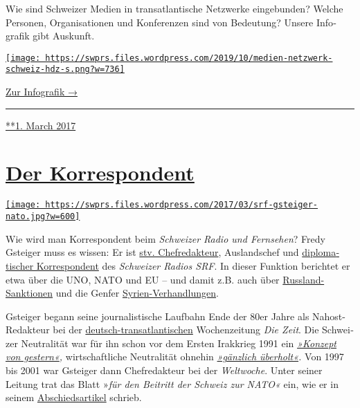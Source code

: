Wie sind Schweizer Medien in trans­at­lantische Netz­werke
ein­ge­bunden? Welche Personen, Organi­sa­tionen und Kon­fe­ren­zen sind
von Bedeutung? Unsere Info­grafik gibt Auskunft.

\href{https://swprs.org/netzwerk-medien-schweiz}{\texttt{[image: https://swprs.files.wordpress.com/2019/10/medien-netzwerk-schweiz-hdz-s.png?w=736]}}

\href{https://swprs.org/netzwerk-medien-schweiz}{Zur Infografik →}

\begin{center}\rule{0.5\linewidth}{\linethickness}\end{center}

\href{https://swprs.org/2017/03/01/das-netzwerk/}{**1. March 2017}

\hypertarget{der-korrespondent}{%
\section{\texorpdfstring{\href{https://swprs.org/2017/03/01/der-korrespondent/}{Der
Korrespondent}}{Der Korrespondent}}\label{der-korrespondent}}

\href{https://swprs.org/2017/03/01/der-korrespondent/}{\texttt{[image: https://swprs.files.wordpress.com/2017/03/srf-gsteiger-nato.jpg?w=600]}}

Wie wird man Kor­res­pon­dent beim \emph{Schwei­zer Radio und
Fern­sehen}? Fredy Gsteiger muss es wissen: Er ist
\href{http://www.persoenlich.com/medien/fredy-gsteiger-neu-in-der-radio-chefredaktion-232921}{stv.
Chef­redakteur}, Auslands­chef und
\href{http://www.srf.ch/radio-srf-1/radio-srf-1/fredy-gsteiger-unser-mann-in-der-uno}{diplo­ma­tischer
Korres­pon­dent} des \emph{Schwei­zer Radios SRF}. In dieser Funktion
be­richtet er etwa über die UNO, NATO und EU -- und damit z.B. auch über
\href{http://www.srf.ch/news/international/dieser-eu-rueckzieher-ist-peinlich}{Russ­land-Sanktionen}
und die Genfer
\href{http://www.srf.ch/news/international/assad-kommt-mit-giftgaseinsaetzen-vorlaeufig-davon}{Syrien-Ver­hand­lungen}.

Gsteiger begann seine journa­lis­tische Lauf­bahn Ende der 80er Jahre
als Nahost-Redakteur bei der
\href{https://swprs.org/netzwerk-medien-deutschland/}{deutsch-trans­atlan­tischen}
Wochen­zeitung \emph{Die Zeit}. Die Schwei­zer Neutra­lität war für ihn
schon vor dem Ersten Irak­krieg 1991 ein
\emph{\href{http://www.zeit.de/1990/44/ein-konzept-von-gestern}{»Konzept
von gestern«},} wirt­schaft­liche Neutralität ohnehin
\emph{\href{http://www.zeit.de/1990/44/ein-konzept-von-gestern}{»gänz­lich
über­holt«}.} Von 1997 bis 2001 war Gsteiger dann Chef­redakteur bei der
\emph{Welt­woche}. Unter seiner Leitung trat das Blatt »\emph{für den
Bei­tritt der Schweiz zur NATO«} ein, wie er in seinem
\href{https://web.archive.org/web/20040722094101/http://www.weltwoche.ch/artikel/?AssetID=400\&CategoryID=60}{Abschieds­artikel}
schrieb.

